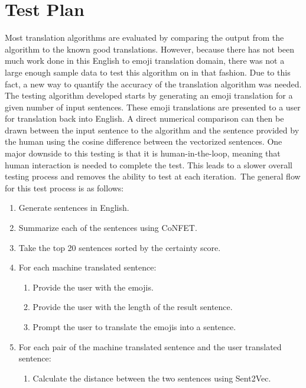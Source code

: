 \documentclass{article}[10]
\begin{document}
\section{Test Plan\label{sec:testPlan}}

Most translation algorithms are evaluated by comparing the output from
the algorithm to the known good translations. However, because there has
not been much work done in this English to emoji translation domain,
there was not a large enough sample data to test this algorithm on in
that fashion. Due to this fact, a new way to quantify the accuracy of
the translation algorithm was needed. The testing algorithm developed
starts by generating an emoji translation for a given number of input
sentences. These emoji translations are presented to a user for
translation back into English. A direct numerical comparison can then be
drawn between the input sentence to the algorithm and the sentence
provided by the human using the cosine difference between the vectorized
sentences. One major downside to this testing is that it is
human-in-the-loop, meaning that human interaction is needed to complete
the test. This leads to a slower overall testing process and removes the
ability to test at each iteration.~The general flow for this test
process is as follows:

\begin{enumerate}[label=(\arabic*)]
\item
  Generate sentences in English.
\item
  Summarize each of the sentences using CoNFET.
\item
  Take the top 20 sentences sorted by the certainty score.
\item
  {For each machine translated sentence:}
    \begin{enumerate}
        \item
          {Provide the user with the emojis.}
        \item
          {Provide the user with the length of the result sentence.}
        \item
          {Prompt the user to translate the emojis into a sentence.}
    \end{enumerate}
\item
  {For each pair of the machine translated sentence and the user
  translated sentence:}
    \begin{enumerate}
      \item
        {Calculate the distance between the two sentences using Sent2Vec.}
    \end{enumerate}
\end{enumerate}
\end{document}
